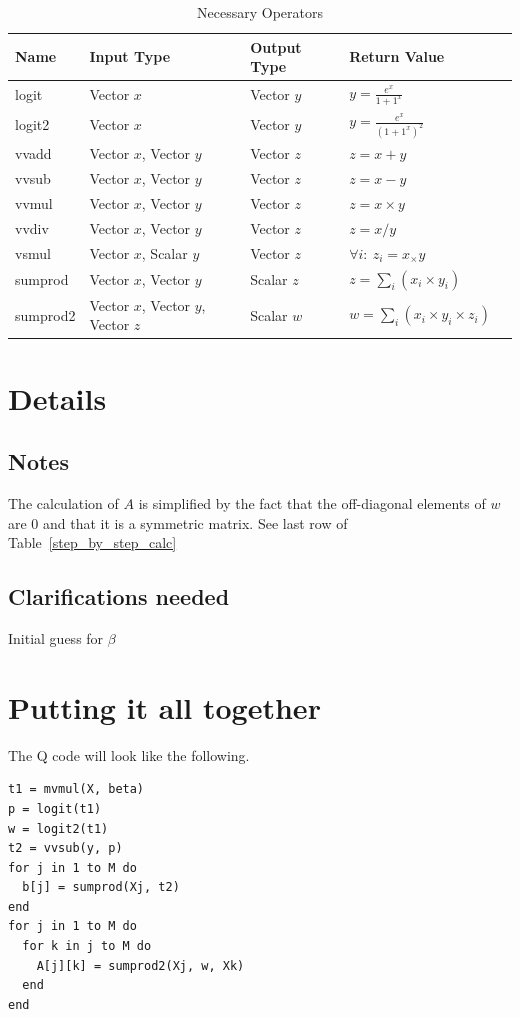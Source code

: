 \documentclass[12pt,timesnewroman,letterpaper]{article}
\begin{document}
\begin{table}[hb]
\centering
\begin{tabular}{|l|l|l|l|l|} \hline \hline
  {\bf Name} & {\bf Input Type} & {\bf Output Type} & {\bf Return Value} \\ \hline \hline
  logit & Vector \(x\) & Vector \(y\) & \(y = \frac{e^x}{1 + 1^x}\) \\ \hline
  logit2 & Vector \(x\) & Vector \(y\) & \(y = \frac{e^x}{(1 + 1^x)^2}\) \\ \hline
  vvadd & Vector \(x\), Vector \(y\) & Vector \(z\) & \(z = x + y \)  \\ \hline
  vvsub & Vector \(x\), Vector \(y\) & Vector \(z\) & \(z = x - y \)  \\ \hline
  vvmul & Vector \(x\), Vector \(y\) & Vector \(z\) & \(z = x \times y \)  \\ \hline
  vvdiv & Vector \(x\), Vector \(y\) & Vector \(z\) & \(z = x / y \)  \\ \hline
  vsmul & Vector \(x\), Scalar \(y\) & Vector \(z\) & \(\forall i:~z_i = x_ \times y \)  \\ \hline
  sumprod & Vector \(x\), Vector \(y\) & Scalar \(z\) & \(z = \sum_i (x_i \times y_i)\) \\ \hline
  sumprod2 & Vector \(x\), Vector \(y\), Vector \(z\) & Scalar \(w\) &  \(w = \sum_i (x_i \times y_i \times z_i)\) \\ \hline
\hline
\end{tabular}
\caption{Necessary Operators}
\label{tbl_custom_ops}
\end{table}


\section{Details}

\subsection{Notes}

\be
\item The calculation of \(A\) is simplified by the fact that the off-diagonal
  elements of \(w\) are 0 and that it is a symmetric matrix. See last row of
  Table~\ref{step_by_step_calc}
\ee
\subsection{Clarifications needed}

\be
\item Initial guess for \(\beta\)
\ee

\section{Putting it all together}
The Q code will look like the following.

\begin{verbatim}
t1 = mvmul(X, beta)  
p = logit(t1)
w = logit2(t1)
t2 = vvsub(y, p)
for j in 1 to M do 
  b[j] = sumprod(Xj, t2)
end
for j in 1 to M do 
  for k in j to M do 
    A[j][k] = sumprod2(Xj, w, Xk)
  end
end
\end{verbatim}
\end{document}
